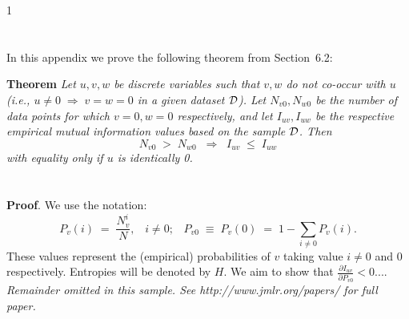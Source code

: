 \documentclass[twoside,11pt]{article}
\newcommand{\dataset}{{\cal D}}
\newcommand{\fracpartial}[2]{\frac{\partial #1}{\partial  #2}}
\begin{document}

1
\newpage

\appendix
\section{}
\label{app:theorem}



In this appendix we prove the following theorem from
Section~6.2:

\noindent
{\bf Theorem} {\it Let $u,v,w$ be discrete variables such that $v, w$ do
not co-occur with $u$ (i.e., $u\neq0\;\Rightarrow \;v=w=0$ in a given
dataset $\dataset$). Let $N_{v0},N_{w0}$ be the number of data points for
which $v=0, w=0$ respectively, and let $I_{uv},I_{uw}$ be the
respective empirical mutual information values based on the sample
$\dataset$. Then
\[
	N_{v0} \;>\; N_{w0}\;\;\Rightarrow\;\;I_{uv} \;\leq\;I_{uw}
\]
with equality only if $u$ is identically 0.} \hfill\BlackBox

\section{}

\noindent
{\bf Proof}. We use the notation:
\[
P_v(i) \;=\;\frac{N_v^i}{N},\;\;\;i \neq 0;\;\;\;
P_{v0}\;\equiv\;P_v(0)\; = \;1 - \sum_{i\neq 0}P_v(i).
\]
These values represent the (empirical) probabilities of $v$
taking value $i\neq 0$ and 0 respectively.  Entropies will be denoted
by $H$. We aim to show that $\fracpartial{I_{uv}}{P_{v0}} < 0$....\\

{\noindent \em Remainder omitted in this sample. See http://www.jmlr.org/papers/ for full paper.}


\vskip 0.2in

\end{document}
